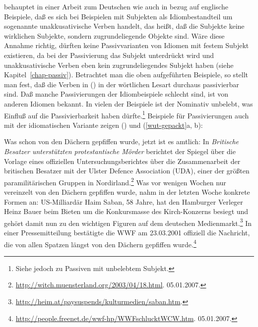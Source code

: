 \citet[]{Scherpenisse86a} behauptet in einer Arbeit zum Deutschen wie auch \citet{Marantz84a}
in bezug auf englische Beispiele,
daß es sich bei Beispielen mit Subjekten als Idiombestandteil um sogenannte unakkusativische Verben
handelt, das heißt, daß die Subjekte keine wirklichen Subjekte,
sondern zugrundeliegende Objekte sind. 
%
Wäre diese Annahme richtig,
dürften keine Passivvarianten von Idiomen mit festem Subjekt existieren,
da bei der Passivierung das Subjekt unterdrückt wird und unakkusativische
Verben eben kein zugrundeliegendes Subjekt haben (siehe Kapitel~\ref{chap-passiv}).
Betrachtet man die oben aufgeführten Beispiele, so stellt man fest, daß die Verben in
() in der wörtlichen Lesart durchaus passivierbar sind.
Daß manche Passivierungen der Idiombeispiele schlecht sind, ist
von anderen Idiomen bekannt. In vielen der Beispiele ist der Nominativ
unbelebt, was Einfluß auf die Passivierbarkeit haben dürfte.\footnote{
        Siehe jedoch  zu Passiven mit
        unbelebtem Subjekt.%
}
Beispiele für Passivierungen auch mit der idiomatischen Variante zeigen () %
und (\ref{wut-gepackt}a, b):

\eal
\ex Was schon von den Dächern gepfiffen wurde, jetzt ist es amtlich: In \emph{Britische Besatzer unterstützten protestantische Mörder} berichtet der Spiegel über die Vorlage eines offiziellen Untersuchungsberichtes über die Zusammenarbeit der britischen Besatzer mit der Ulster Defence Association (UDA), einer der größten paramilitärischen Gruppen in Nordirland.\footnote{
  \url{http://witch.muensterland.org/2003/04/18.html}. 05.01.2007.
}
\ex Was vor wenigen Wochen nur vereinzelt von den Dächern gepfiffen wurde, nahm in der letzten Woche konkrete Formen an: US-Milliardär Haim Saban, 58 Jahre, hat den Hamburger Verleger Heinz Bauer beim Bieten um die Konkursmasse des Kirch-Konzerns besiegt und gehört damit nun zu den wichtigen Figuren auf dem deutschen Medienmarkt.\footnote{
  \url{http://heim.at/paysuspends/kulturmedien/saban.htm}.
}
\ex In einer Pressemitteilung bestätigte die WWF am 23.03.2001 offiziell die Nachricht, die von allen Spatzen längst von den Dächern gepfiffen wurde.\footnote{
  \url{http://people.freenet.de/wwf-hp/WWFschlucktWCW.htm}. 05.01.2007.
}
\zl


